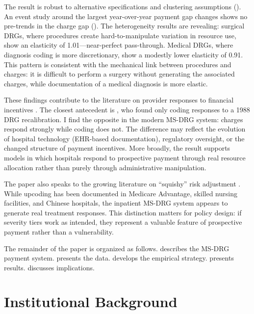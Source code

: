 \documentclass[12pt]{article}
\begin{document}
The result is robust to alternative specifications and clustering assumptions (). An event study around the largest year-over-year payment gap changes shows no pre-trends in the charge gap (). The heterogeneity results are revealing: surgical DRGs, where procedures create hard-to-manipulate variation in resource use, show an elasticity of 1.01---near-perfect pass-through. Medical DRGs, where diagnosis coding is more discretionary, show a modestly lower elasticity of 0.91. This pattern is consistent with the mechanical link between procedures and charges: it is difficult to perform a surgery without generating the associated charges, while documentation of a medical diagnosis is more elastic.

These findings contribute to the literature on provider responses to financial incentives \citep{mcguire2000, ellis1996, clemens2014, einav2018}. The closest antecedent is \citet{dafny2005}, who found only coding responses to a 1988 DRG recalibration. I find the opposite in the modern MS-DRG system: charges respond strongly while coding does not. The difference may reflect the evolution of hospital technology (EHR-based documentation), regulatory oversight, or the changed structure of payment incentives. More broadly, the result supports models in which hospitals respond to prospective payment through real resource allocation \citep{acemoglu2009, newhouse1970} rather than purely through administrative manipulation.

The paper also speaks to the growing literature on ``squishy'' risk adjustment \citep{geruso2020, bowblis2015, wu2015}. While upcoding has been documented in Medicare Advantage, skilled nursing facilities, and Chinese hospitals, the inpatient MS-DRG system appears to generate real treatment responses. This distinction matters for policy design: if severity tiers work as intended, they represent a valuable feature of prospective payment rather than a vulnerability.

The remainder of the paper is organized as follows.  describes the MS-DRG payment system.  presents the data.  develops the empirical strategy.  presents results.  discusses implications.

\section{Institutional Background}
\label{sec:background}
\end{document}
